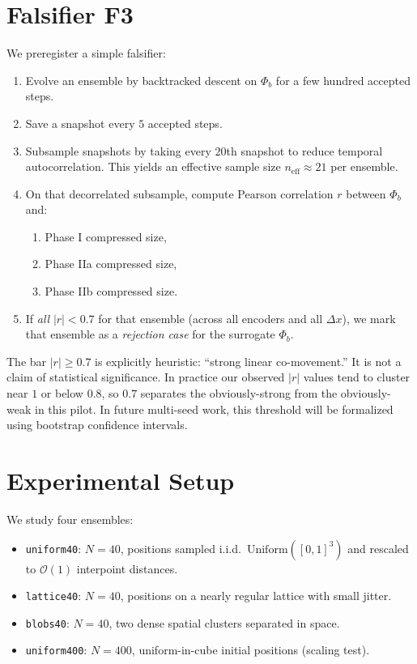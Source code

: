 \documentclass[11pt,a4paper]{article}
\newcommand{\phib}{\Phi_b}
\begin{document}
\section{Falsifier F3}
We preregister a simple falsifier:

\begin{enumerate}
\item Evolve an ensemble by backtracked descent on $\phib$ for a few hundred accepted steps.
\item Save a snapshot every $5$ accepted steps.
\item Subsample snapshots by taking every $20$th snapshot to reduce temporal autocorrelation. This yields an effective sample size $n_{\text{eff}} \approx 21$ per ensemble.
\item On that decorrelated subsample, compute Pearson correlation $r$ between $\phib$ and:
  \begin{enumerate}
  \item Phase I compressed size,
  \item Phase IIa compressed size,
  \item Phase IIb compressed size.
  \end{enumerate}
\item If \emph{all} $|r| < 0.7$ for that ensemble (across all encoders and all $\Delta x$), we mark that ensemble as a \emph{rejection case} for the surrogate $\phib$.
\end{enumerate}

The bar $|r|\ge 0.7$ is explicitly heuristic: ``strong linear co-movement.'' It is not a claim of statistical significance. In practice our observed $|r|$ values tend to cluster near $1$ or below $0.8$, so $0.7$ separates the obviously-strong from the obviously-weak in this pilot. In future multi-seed work, this threshold will be formalized using bootstrap confidence intervals.

\section{Experimental Setup}
We study four ensembles:

\begin{itemize}
\item \texttt{uniform40}: $N{=}40$, positions sampled i.i.d.\ $\mathrm{Uniform}([0,1]^3)$ and rescaled to $\mathcal{O}(1)$ interpoint distances.
\item \texttt{lattice40}: $N{=}40$, positions on a nearly regular lattice with small jitter.
\item \texttt{blobs40}: $N{=}40$, two dense spatial clusters separated in space.
\item \texttt{uniform400}: $N{=}400$, uniform-in-cube initial positions (scaling test).
\end{itemize}
\end{document}
